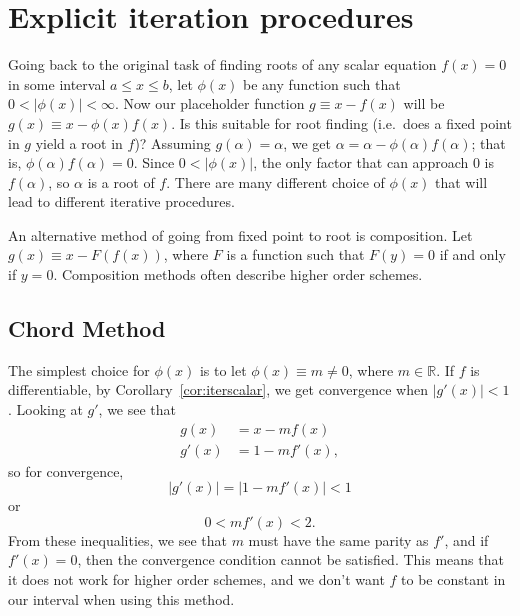\documentclass[12pt,letterpaper,DIV=11]{scrartcl}
\theoremstyle{plain}
\theoremstyle{definition}
\theoremstyle{remark}
\begin{document}
\section{Explicit iteration procedures}
Going back to the original task of finding roots of any scalar equation $f(x) = 0$ in some interval $a \leq x \leq b$,
let $\phi(x)$ be any function such that $0 < |\phi(x)| < \infty$.
Now our placeholder function $g \equiv x - f(x)$ will be $g(x) \equiv x - \phi(x) f(x)$.
Is this suitable for root finding (i.e.\ does a fixed point in $g$ yield a root in $f$)?
Assuming $g(\alpha) = \alpha$, we get $\alpha = \alpha - \phi(\alpha) f(\alpha)$; that is, $\phi(\alpha) f(\alpha) = 0$.
Since $0 < |\phi(x)|$, the only factor that can approach 0 is $f(\alpha)$, so $\alpha$ is a root of $f$.
There are many different choice of $\phi(x)$ that will lead to different iterative procedures.

An alternative method of going from fixed point to root is composition.
Let $g(x) \equiv x - F(f(x))$, where $F$ is a function such that $F(y) = 0$ if and only if $y = 0$.
Composition methods often describe higher order schemes.

\subsection{Chord Method}
The simplest choice for $\phi(x)$ is to let $\phi(x) \equiv m \neq 0$, where $m \in \mathbb{R}$.
If $f$ is differentiable, by Corollary~\ref{cor:iterscalar}, we get convergence when $|g'(x)| < 1$.
Looking at $g'$, we see that \begin{align*}
  g(x) &= x - m f(x) \\
  g'(x) &= 1 - m f'(x),
\end{align*}
so for convergence, \begin{equation}
  |g'(x)| = |1 - m f'(x)| < 1
\end{equation} or
\begin{equation}\label{eqn:chordconvergence2}
  0 < m f'(x) < 2.
\end{equation}
From these inequalities, we see that $m$ must have the same parity as $f'$, and if $f'(x) = 0$, then the convergence condition cannot be satisfied.
This means that it does not work for higher order schemes, and we don't want $f$ to be constant in our interval when using this method.
\end{document}
